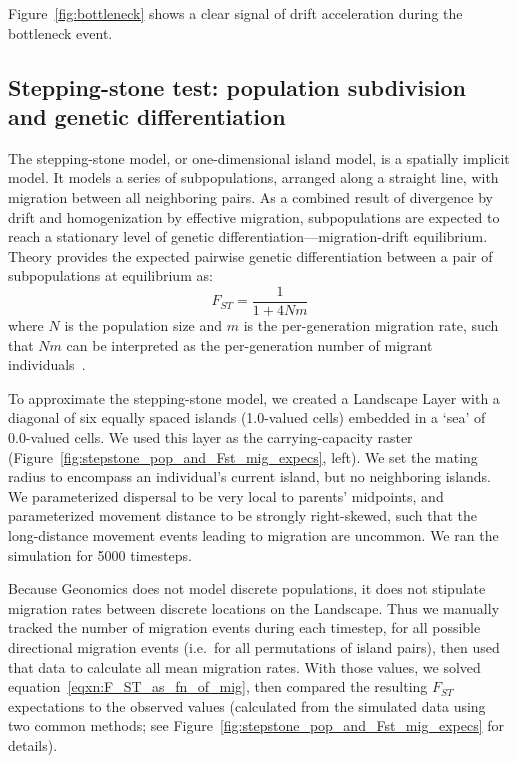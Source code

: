 ﻿\documentclass{article}
\begin{document}
Figure~\ref{fig:bottleneck} shows a clear signal of drift acceleration during the bottleneck event.


\subsection{Stepping-stone test: population subdivision and genetic differentiation}
The stepping-stone model, or one-dimensional island model, is a spatially implicit model.
It models a series of subpopulations, arranged along a straight line,
with migration between all neighboring pairs.
As a combined result of divergence by drift and homogenization
by effective migration, subpopulations are expected to reach
a stationary level of genetic differentiation---migration-drift equilibrium. 
Theory provides the expected pairwise genetic differentiation
between a pair of subpopulations at equilibrium as:
\begin{equation}
        F_{ST} = \frac{1}{1 + 4Nm}
\label{eqxn:F_ST_as_fn_of_mig}
\end{equation}
where $N$ is the population size and $m$ is the per-generation migration rate,
such that $Nm$ can be interpreted as the per-generation number of migrant
individuals~\cite{hartl}.

To approximate the stepping-stone model, we created a Landscape Layer with a diagonal
of six equally spaced islands (1.0-valued cells) embedded in a `sea' of 0.0-valued cells.
We used this layer as the carrying-capacity raster (Figure~\ref{fig:stepstone_pop_and_Fst_mig_expecs}, left).
We set the mating radius to encompass an individual's current island, but no neighboring islands.
We parameterized dispersal to be very local to parents' midpoints, and
parameterized movement distance to be strongly right-skewed, such that
the long-distance movement events leading to migration are uncommon.
We ran the simulation for 5000 timesteps.

Because Geonomics does not model discrete populations, it does not stipulate
migration rates between discrete locations on the Landscape.
Thus we manually tracked the number of migration events during each timestep,
for all possible directional migration events (i.e.\ for all permutations of island pairs),
then used that data to calculate all mean migration rates.
With those values, we solved equation~\ref{eqxn:F_ST_as_fn_of_mig},
then compared the resulting $F_{ST}$ expectations to the observed values
(calculated from the simulated data using two common methods;
see Figure~\ref{fig:stepstone_pop_and_Fst_mig_expecs} for details).
\end{document}
